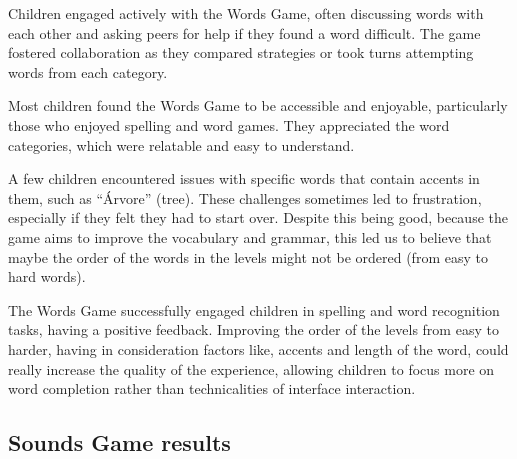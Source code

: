 Children engaged actively with the Words Game, often discussing words with each other and asking peers for help if they found a word difficult. The game fostered collaboration as they compared strategies or took turns attempting words from each category.

Most children found the Words Game to be accessible and enjoyable, particularly those who enjoyed spelling and word games. They appreciated the word categories, which were relatable and easy to understand.

A few children encountered issues with specific words that contain accents in them, such as ``Árvore'' (tree). These challenges sometimes led to frustration, especially if they felt they had to start over. Despite this being good, because the game aims to improve the vocabulary and grammar, this led us to believe that maybe the order of the words in the levels might not be ordered (from easy to hard words).

The Words Game successfully engaged children in spelling and word recognition tasks, having a positive feedback. Improving the order of the levels from easy to harder, having in consideration factors like, accents and length of the word, could really increase the quality of the experience, allowing children to focus more on word completion rather than technicalities of interface interaction.





% 




\newpage
\subsection{Sounds Game results}

